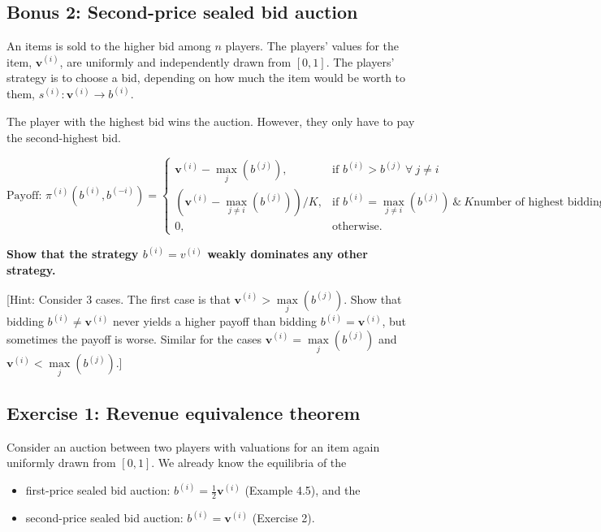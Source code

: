 \documentclass[10pt]{article}
\begin{document}
\subsection*{Bonus 2: Second-price sealed bid auction}

An items is sold to the higher bid among \(n\) players. The players' values for
the item, \(\mathbf{v}^{(i)}\), are uniformly and independently drawn from \([0, 1]\).
The players' strategy is to choose a bid, depending on how much the item would be
worth to them, \(s^{(i)}: \mathbf{v}^{(i)} \rightarrow b^{(i)}\).

The player with the highest bid wins the auction. However, they only have to
pay the second-highest bid.

\begin{equation*}
\text{Payoff: }    \pi^{(i)} (b^{(i)}, b^{(-i)}) = 
    \begin{cases}
        \mathbf{v}^{(i)} - \max\limits_j(b^{(j)}), & \text{if } b^{(i)} > b^{(j)} \ \forall \ j \neq i \\
        (\mathbf{v}^{(i)} - \max\limits_{j \neq i}(b^{(j)})) / K, & \text{if } b^{(i)} = \max\limits_{j \neq i} (b^{(j)}) \ \& \ K \text{number of highest biddings}\\
        0,              & \text{otherwise}.
    \end{cases}
\end{equation*}

\textbf{Show that the strategy \(b^{(i)} = v^{(i)}\) weakly dominates any other
strategy.}

[Hint: Consider 3 cases. The first case is that \(\textbf{v}^{(i)} > \max\limits_j (b^{(j)})\).
Show that bidding \(b^{(i)} \neq \textbf{v}^{(i)}\) never yields a higher payoff than bidding
\(b^{(i)} = \textbf{v}^{(i)}\), but sometimes the payoff is worse. Similar for the cases
\(\textbf{v}^{(i)} = \max\limits_j (b^{(j)})\) and \(\textbf{v}^{(i)} < \max\limits_j (b^{(j)})\).]


\subsection*{Exercise 1: Revenue equivalence theorem}

Consider an auction between two players with valuations for an item again uniformly
drawn from \([0, 1]\). We already know the equilibria of the


\begin{itemize}
    \item first-price sealed bid auction: \(b ^ {(i)} =  \frac{1}{2} \textbf{v}^{(i)}\) (Example 4.5), and the
    \item second-price sealed bid auction: \(b ^ {(i)} =  \textbf{v}^{(i)}\) (Exercise 2).
\end{itemize}
\end{document}
